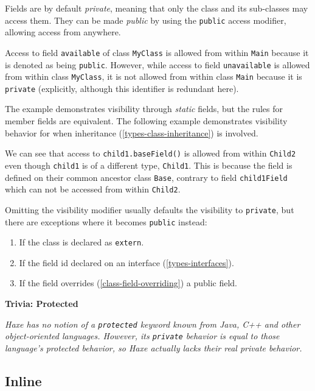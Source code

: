 \documentclass[a4paper,oneside]{book}
\newcommand{\type}[1]{\texttt{#1}}
\newcommand{\expr}[1]{\texttt{#1}}
\newenvironment{myshaded}
  {\def\FrameCommand{\fboxsep=\topsep\colorbox{bgcolor}}%
  \MakeFramed {\advance\hsize-\width \FrameRestore}}%
 {\endMakeFramed}
\newcommand{\trivia}[2]
	{\begin{myshaded}\noindent\textbf{Trivia: #1}\par\nobreak\noindent\ignorespaces\textit{#2}\end{myshaded}}
\newcommand{\tref}[2]{#1 (\ref{#2})}
\newcommand{\haxe}[2][]{%
}
\begin{document}
Fields are by default \emph{private}, meaning that only the class and its sub-classes may access them. They can be made \emph{public} by using the \expr{public} access modifier, allowing access from anywhere.

\haxe{assets/Visibility.hx}

Access to field \expr{available} of class \type{MyClass} is allowed from within \type{Main} because it is denoted as being \expr{public}. However, while access to field \expr{unavailable} is allowed from within class \type{MyClass}, it is not allowed from within class \type{Main} because it is \expr{private} (explicitly, although this identifier is redundant here).

The example demonstrates visibility through \emph{static} fields, but the rules for member fields are equivalent. The following example demonstrates visibility behavior for when \tref{inheritance}{types-class-inheritance} is involved.

\haxe{assets/Visibility2.hx}

We can see that access to \expr{child1.baseField()} is allowed from within \type{Child2} even though \expr{child1} is of a different type, \type{Child1}. This is because the field is defined on their common ancestor class \type{Base}, contrary to field \expr{child1Field} which can not be accessed from within \type{Child2}.

Omitting the visibility modifier usually defaults the visibility to \expr{private}, but there are exceptions where it becomes \expr{public} instead:

\begin{enumerate}
	\item If the class is declared as \expr{extern}.
	\item If the field id declared on an \tref{interface}{types-interfaces}.
	\item If the field \tref{overrides}{class-field-overriding} a public field.
\end{enumerate}

\trivia{Protected}{Haxe has no notion of a \expr{protected} keyword known from Java, C++ and other object-oriented languages. However, its \expr{private} behavior is equal to those language's protected behavior, so Haxe actually lacks their real private behavior.}

\subsection{Inline}
\label{class-field-inline}
\end{document}
